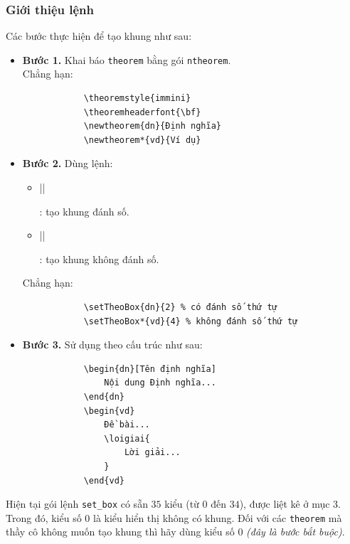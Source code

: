 \documentclass[12pt,a4paper,twoside]{article}
\renewcommand{\verb}{\collectverb{\color{blue}}}
\theoremstyle{immini}
\newtheorem{dn}{Định nghĩa}
\newtheorem*{vd}{Ví dụ}
\begin{document}
	\subsubsection{Giới thiệu lệnh}
	Các bước thực hiện để tạo khung như sau:
	\begin{itemize}
		\item \textbf{Bước 1.} Khai báo \texttt{theorem} bằng gói \texttt{ntheorem}.\\
		Chẳng hạn:
		\begin{verbatim}
			\theoremstyle{immini}
			\theoremheaderfont{\bf}
			\newtheorem{dn}{Định nghĩa}
			\newtheorem*{vd}{Ví dụ}
		\end{verbatim}
		\item \textbf{Bước 2.} Dùng lệnh:
		\begin{itemize}
			\item
			\begin{lrbox}{\myverbcontent}
				\verb||
			\end{lrbox}
			\fbox{\usebox{\myverbcontent}}: tạo khung đánh số.
			\item 
			\begin{lrbox}{\myverbcontent}
				\verb||
			\end{lrbox}
			\fbox{\usebox{\myverbcontent}}: tạo khung không đánh số.
		\end{itemize}
		Chẳng hạn:
		\begin{verbatim}
			\setTheoBox{dn}{2} % có đánh số thứ tự
			\setTheoBox*{vd}{4} % không đánh số thứ tự 
		\end{verbatim}
		\item \textbf{Bước 3.} Sử dụng theo cấu trúc như sau:
		\begin{verbatim}
			\begin{dn}[Tên định nghĩa]
				Nội dung Định nghĩa...
			\end{dn}
			\begin{vd}
				Đề bài...
				\loigiai{
					Lời giải...
				}
			\end{vd}
		\end{verbatim}
	\end{itemize}\par
	Hiện tại gói lệnh \texttt{set\_box} có sẵn $35$ kiểu (từ $0$ đến $34$), được liệt kê ở mục $3$. Trong đó, kiểu số 0 là kiểu hiển thị không có khung. Đối với các \texttt{theorem} mà thầy cô không muốn tạo khung thì hãy dùng kiểu số $0$ \textit{(đây là bước bắt buộc)}.
	\newpage
\end{document}
